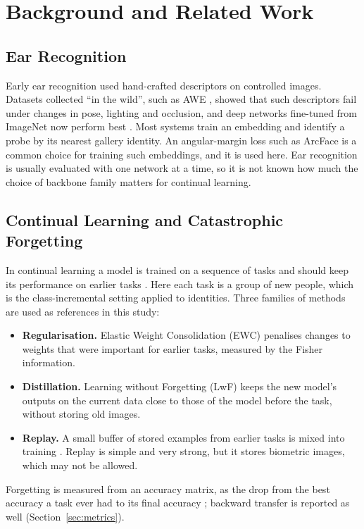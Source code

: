 \documentclass[12pt,a4paper]{report}
\begin{document}
\chapter{Background and Related Work}\label{ch:background}

\section{Ear Recognition}
Early ear recognition used hand-crafted descriptors on controlled images. Datasets collected ``in the wild'', such as AWE \cite{emersic2017survey}, showed that such descriptors fail under changes in pose, lighting and occlusion, and deep networks fine-tuned from ImageNet now perform best \cite{emersic2017survey,emersic2023uerc}. Most systems train an embedding and identify a probe by its nearest gallery identity. An angular-margin loss such as ArcFace \cite{deng2019arcface} is a common choice for training such embeddings, and it is used here. Ear recognition is usually evaluated with one network at a time, so it is not known how much the choice of backbone family matters for continual learning.

\section{Continual Learning and Catastrophic Forgetting}
In continual learning a model is trained on a sequence of tasks and should keep its performance on earlier tasks \cite{delange2021survey}. Here each task is a group of new people, which is the class-incremental setting \cite{vandeven2019three} applied to identities. Three families of methods are used as references in this study:
\begin{itemize}
\item \textbf{Regularisation.} Elastic Weight Consolidation (EWC) \cite{kirkpatrick2017ewc} penalises changes to weights that were important for earlier tasks, measured by the Fisher information.
\item \textbf{Distillation.} Learning without Forgetting (LwF) \cite{li2017lwf} keeps the new model's outputs on the current data close to those of the model before the task, without storing old images.
\item \textbf{Replay.} A small buffer of stored examples from earlier tasks is mixed into training \cite{rebuffi2017icarl,chaudhry2019tiny}. Replay is simple and very strong, but it stores biometric images, which may not be allowed.
\end{itemize}
Forgetting is measured from an accuracy matrix, as the drop from the best accuracy a task ever had to its final accuracy \cite{chaudhry2018riemannian}; backward transfer \cite{lopezpaz2017gem} is reported as well (Section~\ref{sec:metrics}).
\end{document}

